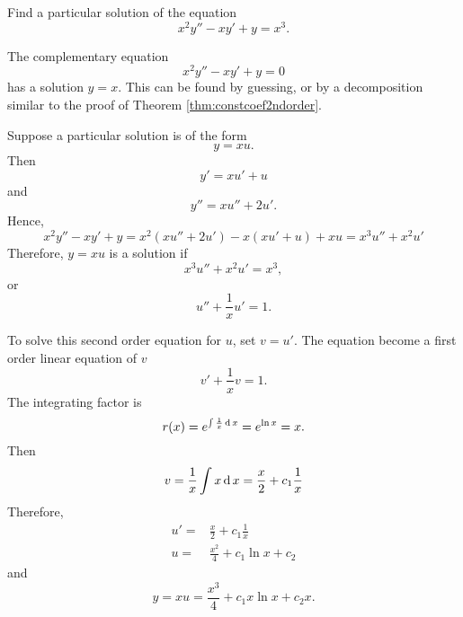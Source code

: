 \begin{exercise}
  Find a particular solution of the equation
\[x^2 y'' -  x y' + y =x^3.\]
\end{exercise}
\begin{exersol}
  The complementary equation 
  \[x^2 y'' -  x y' + y=0\]
  has a solution $y=x$. This can be found by guessing, or by a decomposition similar to the proof of Theorem \ref{thm:constcoef2ndorder}.

  Suppose a particular solution is of the form
\[y = x u.\] 
Then
\[y' = x u '+  u\]
and 
\[y'' = x u'' + 2 u'.\]
Hence,
\[x^2y'' - xy' + y = x^2 ( x u'' + 2 u')    - x (xu' + u) + xu = x^3 u''  + x^2 u'\]
Therefore, $y= x u$ is a solution if 
\[x^3 u''  + x^2  u' = x^3, \]
or
\[u''  + \frac{1}{x}  u' = 1.\]

To solve this second order equation for $u$, set $v = u'$. The equation become a first order linear equation of $v$
\[v' + \frac{1}{x} v =1.\]
The integrating factor is 
\[r(x)= e^{\int  \frac{1}{x} \operatorname{d} x} = e^{\ln x} = x.\]
Then 
\[v =\frac{1}{x}\int x \operatorname{d} x= \frac{x}{2} + c_1\frac{1}{x}\]
Therefore,
\[ 
  \begin{aligned}
    u' =&\frac{x}{2} + c_1\frac{1}{x}\\
    u =& \frac{x^2}{4} + c_1 \ln x + c_2
  \end{aligned}
\]
and 
\[y = xu =  \frac{x^3}{4} + c_1 x \ln x+ c_2 x.\]
\end{exersol}